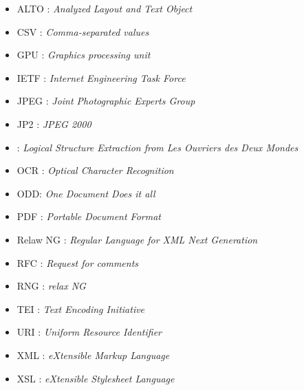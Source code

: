 \begin{itemize}
    \item ALTO : \textit{Analyzed Layout and Text Object}
    \item CSV : \textit{Comma-separated values}
    \item GPU : \textit{Graphics processing unit}
    \item IETF : \textit{Internet Engineering Task Force}
    \item JPEG : \textit{Joint Photographic Experts Group}
    \item JP2 : \textit{JPEG 2000}
    \item \lse{} : \textit{Logical Structure Extraction from Les Ouvriers des Deux Mondes}
    \item OCR : \textit{Optical Character Recognition}
    \item ODD: \textit{One Document Does it all}
    \item PDF : \textit{Portable Document Format}
    \item Relaw NG : \textit{Regular Language for XML Next Generation}
    \item RFC : \textit{Request for comments}
    \item RNG : \cf{} \textit{relax NG}
    \item TEI : \textit{Text Encoding Initiative}
    \item URI : \textit{Uniform Resource Identifier}
    \item XML : \textit{eXtensible Markup Language}
    \item XSL : \textit{eXtensible Stylesheet Language}
\end{itemize}

\clearpage
\thispagestyle{empty}